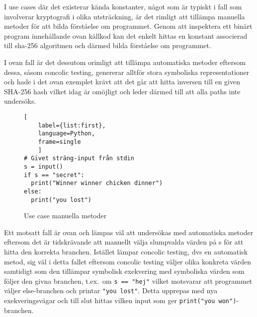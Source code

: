 I use cases där det existerar kända konstanter, något som är typiskt i fall som
involverar kryptografi i olika utsträckning, är det rimligt att tillämpa
manuella metoder för att bilda förståelse om programmet. Genom att inspektera
ett binärt program innehållande ovan källkod kan det enkelt hittas en konstant
associerad till sha-256 algoritmen och därmed bilda förståelse om programmet.

I ovan fall är det dessutom orimligt att tillämpa automatiska metoder eftersom
dessa, såsom concolic testing, genererar alltför stora symboliska
representationer och hade i det ovan exemplet krävt att det går att hitta
inversen till en given SHA-256 hash vilket idag är omöjligt och leder därmed
till att alla paths inte undersöks.

\begin{figure}
    \begin{lstlisting}[
    label={list:first},
    language=Python,
    frame=single
    ]
# Givet sträng-input från stdin
s = input()
if s == "secret":
  print("Winner winner chicken dinner")
else:
  print("you lost")
\end{lstlisting}
    \caption{Use case manuella metoder}
\end{figure}

Ett motsatt fall är ovan och lämpas väl att undersökas med automatiska
metoder eftersom det är tidskrävande att manuellt välja slumpvalda värden på s
för att hitta den korrekta branchen. Istället lämpar concolic testing, dvs en
automatisk metod, sig väl i detta fallet eftersom concolic testing väljer olika
konkreta värden samtidigt som den tillämpar symbolisk exekvering med symboliska
värden som följer den givna branchen, t.ex.\ om \lstinline{s == "hej"} vilket
motsvarar att programmet väljer else-branchen och printar \lstinline{"you lost"}.
Detta upprepas med nya exekveringsvägar och till slut hittas vilken input som ger
\lstinline{print("you won")}-branchen.
